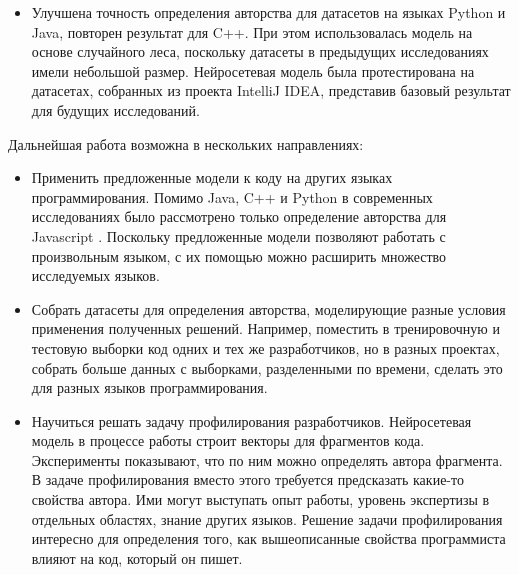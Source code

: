\begin{itemize}
    \item Улучшена точность определения авторства для датасетов на языках Python и Java, повторен результат для C++. При этом использовалась модель на основе случайного леса, поскольку датасеты в предыдущих исследованиях имели небольшой размер. Нейросетевая модель была протестирована на датасетах, собранных из проекта IntelliJ IDEA, представив базовый результат для будущих исследований.
\end{itemize}

Дальнейшая работа возможна в нескольких направлениях:
\begin{itemize}
    \item Применить предложенные модели к коду на других языках программирования. Помимо Java, C++ и Python в современных исследованиях было рассмотрено только определение авторства для Javascript \cite{Wisse2015}. Поскольку предложенные модели позволяют работать с произвольным языком, с их помощью можно расширить множество исследуемых языков.
    \item Собрать датасеты для определения авторства, моделирующие разные условия применения полученных решений. Например, поместить в тренировочную и тестовую выборки код одних и тех же разработчиков, но в разных проектах, собрать больше данных с выборками, разделенными по времени, сделать это для разных языков программирования.
    \item Научиться решать задачу профилирования разработчиков. Нейросетевая модель в процессе работы строит векторы для фрагментов кода. Эксперименты показывают, что по ним можно определять автора фрагмента. В задаче профилирования вместо этого требуется предсказать какие-то свойства автора. Ими могут выступать опыт работы, уровень экспертизы в отдельных областях, знание других языков. Решение задачи профилирования интересно для определения того, как вышеописанные свойства программиста влияют на код, который он пишет.
\end{itemize}
